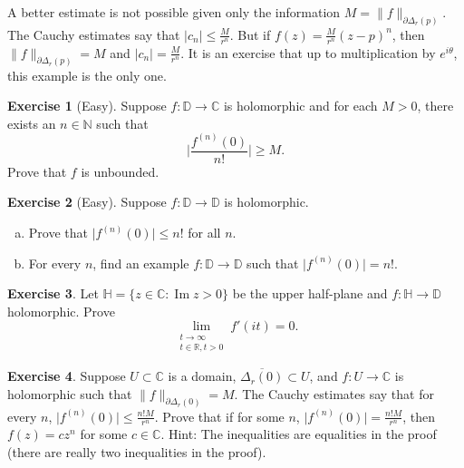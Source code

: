 \documentclass[12pt,openany]{book}
\renewcommand{\Im}{\operatorname{Im}}
\newcommand{\sabs}[1]{\lvert {#1} \rvert}
\newcommand{\snorm}[1]{\lVert {#1} \rVert}
\newcommand{\bbabs}[1]{\biggl\lvert {#1} \biggr\rvert}
\newcommand{\C}{{\mathbb{C}}}
\newcommand{\R}{{\mathbb{R}}}
\newcommand{\N}{{\mathbb{N}}}
\newcommand{\D}{{\mathbb{D}}}
\newcommand{\bH}{{\mathbb{H}}}
\theoremstyle{plain}
\theoremstyle{remark}
\theoremstyle{definition}
\newenvironment{exbox}{%
    \def\FrameCommand{\vrule width 1pt \relax\hspace{10pt}}%
    \MakeFramed{\advance\hsize-\width\FrameRestore}%
}{%
    \endMakeFramed
}
\newenvironment{exparts}{%
    \leavevmode\begin{enumerate}[a),noitemsep,topsep=0pt,parsep=0pt,partopsep=0pt]
}{%
    \end{enumerate}
}
\theoremstyle{exercise}
\newtheorem{exercise}{Exercise}[section]
\theoremstyle{example}
\begin{document}
A better estimate is not possible given only the information
$M = \snorm{f}_{\partial \Delta_r(p)}$.
The Cauchy estimates say that
$\sabs{c_n} \leq \frac{M}{r^n}$.
But if $f(z) = \frac{M}{r^n} {(z-p)}^n$, then
$\snorm{f}_{\partial \Delta_r(p)} = M$ and
$\sabs{c_n} = \frac{M}{r^n}$.  It is an exercise that up to
multiplication by $e^{i\theta}$, this example is the only one.

\begin{exbox}
\begin{exercise}[Easy]
Suppose $f \colon \D \to \C$ is holomorphic and for each $M > 0$, there
exists an $n \in \N$ such that
\begin{equation*}
\bbabs{\frac{f^{(n)}(0)}{n!}} \geq M .
\end{equation*}
Prove that $f$ is unbounded.
\end{exercise}

\begin{exercise}[Easy]
Suppose $f \colon \D \to \D$ is holomorphic.
\begin{exparts}
\item
Prove that $\sabs{f^{(n)}(0)}
\leq n!$ for all $n$.
\item
For every $n$, find an example $f \colon \D \to \D$ such that
$\sabs{f^{(n)}(0)} = n!$.
\end{exparts}
\end{exercise}

\begin{exercise}
Let $\bH = \{ z \in \C : \Im z > 0 \}$ be the upper half-plane
and $f \colon \bH \to \D$ holomorphic.  Prove
\begin{equation*}
\lim_{\substack{t \to \infty\\t \in \R, t > 0}} f'(it) = 0 .
\end{equation*}
\end{exercise}

\begin{exercise}
Suppose $U \subset \C$ is a domain,
$\overline{\Delta_r(0)} \subset U$, and
$f \colon U \to \C$ is holomorphic such that
$\snorm{f}_{\partial \Delta_r(0)} = M$.
The Cauchy estimates say that for every $n$,
$\sabs{f^{(n)}(0)} \leq \frac{n! M}{r^n}$.  Prove that if for some $n$, 
$\sabs{f^{(n)}(0)} = \frac{n! M}{r^n}$, then $f(z) = c z^n$ for some $c \in
\C$.  Hint: The inequalities are equalities in the proof (there are
really two inequalities in the proof).
\end{exercise}
\end{exbox}
\end{document}
